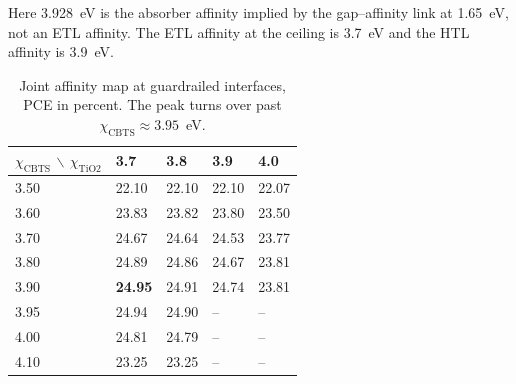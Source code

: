 \documentclass[11pt,a4paper]{article}
\begin{document}
\begin{table}[tbp]
\centering
\caption{Ceiling-point parameters and result. This is the highest evaluated guardrail-satisfying configuration on the named geometries, not a proven global optimum.}
\label{tab:champ}
\end{table}

Here 3.928~eV is the absorber affinity implied by the gap--affinity link at 1.65~eV, not an ETL affinity. The ETL affinity at the ceiling is 3.7~eV and the HTL affinity is 3.9~eV.

\begin{table}[p]
\centering
\caption{Joint affinity map at guardrailed interfaces, PCE in percent. The peak turns over past $\chi_{\mathrm{CBTS}}\approx3.95$~eV.}
\label{tab:chia}
\begin{tabular}{|l|l|l|l|l|}
\hline\hline
$\chi_{\mathrm{CBTS}}$ $\backslash$ $\chi_{\mathrm{TiO2}}$ & 3.7 & 3.8 & 3.9 & 4.0 \\
\hline
3.50 & 22.10 & 22.10 & 22.10 & 22.07 \\
3.60 & 23.83 & 23.82 & 23.80 & 23.50 \\
3.70 & 24.67 & 24.64 & 24.53 & 23.77 \\
3.80 & 24.89 & 24.86 & 24.67 & 23.81 \\
3.90 & \textbf{24.95} & 24.91 & 24.74 & 23.81 \\
3.95 & 24.94 & 24.90 & -- & \mbox{--} \\
4.00 & 24.81 & 24.79 & -- & \mbox{--} \\
4.10 & 23.25 & 23.25 & -- & \mbox{--} \\
\hline\hline
\end{tabular}
\end{table}
\end{document}
